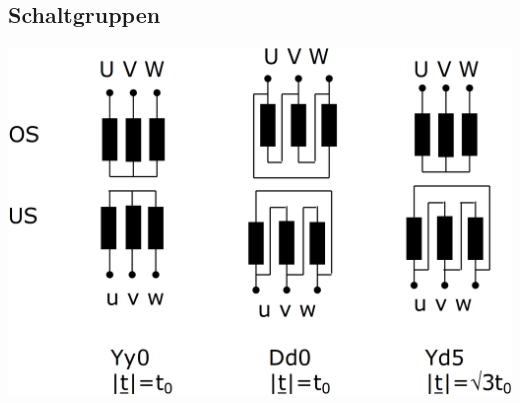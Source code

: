 \subsection{Schaltgruppen}

\includegraphics[width=0.75\columnwidth, align=c]{images/Schaltgruppen.png}






























